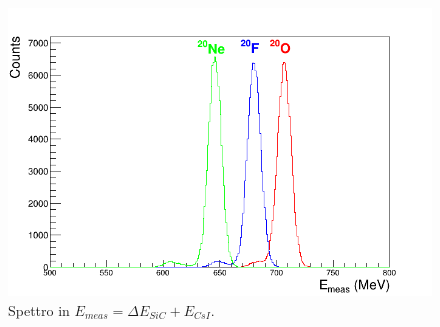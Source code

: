 \begin{figure} [!p]
	\centering
	\includegraphics[scale=0.5]{Grafici_Tesi2/Particelle_monocromatiche/ETot.png}
	\caption{Spettro in $E_{meas} = \Delta E_{SiC} + E_{CsI}$.} \label{fig:ETot}
\end{figure}









\subsection{} \label{par:particelle_non_monocromatiche}







